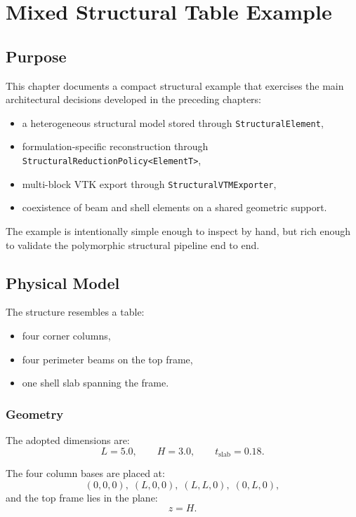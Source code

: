 \chapter{Mixed Structural Table Example}

\section{Purpose}

This chapter documents a compact structural example that exercises the main
architectural decisions developed in the preceding chapters:
\begin{itemize}
  \item a heterogeneous structural model stored through
        \texttt{StructuralElement},
  \item formulation-specific reconstruction through
        \texttt{StructuralReductionPolicy<ElementT>},
  \item multi-block VTK export through \texttt{StructuralVTMExporter},
  \item coexistence of beam and shell elements on a shared geometric support.
\end{itemize}

The example is intentionally simple enough to inspect by hand, but rich enough
to validate the polymorphic structural pipeline end to end.

\section{Physical Model}

The structure resembles a table:
\begin{itemize}
  \item four corner columns,
  \item four perimeter beams on the top frame,
  \item one shell slab spanning the frame.
\end{itemize}

\subsection{Geometry}

The adopted dimensions are:
\[
L = 5.0, \qquad H = 3.0, \qquad t_\mathrm{slab} = 0.18.
\]

The four column bases are placed at:
\[
(0,0,0),\; (L,0,0),\; (L,L,0),\; (0,L,0),
\]
and the top frame lies in the plane:
\[
z = H.
\]

